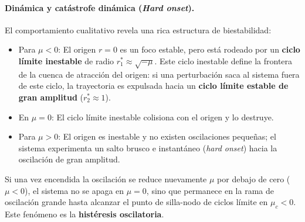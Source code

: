 \paragraph{Dinámica y catástrofe dinámica (\emph{Hard onset}).}
El comportamiento cualitativo revela una rica estructura de biestabilidad:
\begin{itemize}
    \item Para $\mu < 0$: El origen $r = 0$ es un foco estable, pero está rodeado por un \textbf{ciclo límite inestable} de radio $r_1^* \approx \sqrt{-\mu}$. Este ciclo inestable define la frontera de la cuenca de atracción del origen: si una perturbación saca al sistema fuera de este ciclo, la trayectoria es expulsada hacia un \textbf{ciclo límite estable de gran amplitud} ($r_2^* \approx 1$).
    \item En $\mu = 0$: El ciclo límite inestable colisiona con el origen y lo destruye.
    \item Para $\mu > 0$: El origen es inestable y no existen oscilaciones pequeñas; el sistema experimenta un salto brusco e instantáneo (\emph{hard onset}) hacia la oscilación de gran amplitud.
\end{itemize}

Si una vez encendida la oscilación se reduce nuevamente $\mu$ por debajo de cero ($\mu < 0$), el sistema no se apaga en $\mu = 0$, sino que permanece en la rama de oscilación grande hasta alcanzar el punto de silla-nodo de ciclos límite en $\mu_c < 0$. Este fenómeno es la \textbf{histéresis oscilatoria}.


